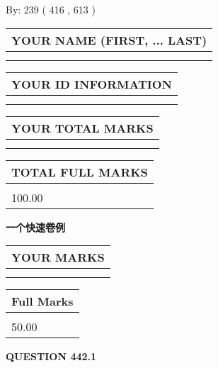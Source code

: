 \documentclass{ctexart}
\begin{document}
   
\hspace{1.0in} By: 
 239 ( 416 ,  613 )
   
   
   
   
\newpage 
\setcounter{page}{ 
   442001 } 
   
   
   
   
\noindent\begin{tabular}{|l|}
\hline
YOUR NAME (FIRST, ... LAST)  \\
\hline
 \\ 
 \\ 
\hline
\end{tabular}
\hspace{0.05in} \begin{tabular}{|l|}
\hline
 YOUR   ID   INFORMATION  \\
\hline
 \\ 
 \\ 
\hline
\end{tabular}
   
   
\vspace{0.2in}\noindent\begin{tabular}{|l|}
\hline
YOUR TOTAL MARKS  \\
\hline
 \\ 
 \\ 
\hline
\end{tabular}
\hspace{0.05in} \begin{tabular}{|l|}
\hline
TOTAL FULL MARKS  \\
\hline
 \\ 
100.00 \\
\hline
\end{tabular}
   
   
 \vspace{0.2in}
{\LARGE {\textbf{ 一个快速卷例}}}
   
   
  
\vspace{0.2in}
  
\noindent\begin{tabular}{|l|}
\hline
 YOUR MARKS  \\
\hline
 \\ 
 \\ 
\hline
\end{tabular}
\hspace{0.05in} \begin{tabular}{|l|}
\hline
 Full Marks  \\
\hline
 \\ 
50.00 \\
\hline
\end{tabular}
{\textbf{\Large{QUESTION
442.1 
}}}
  
\end{document}
